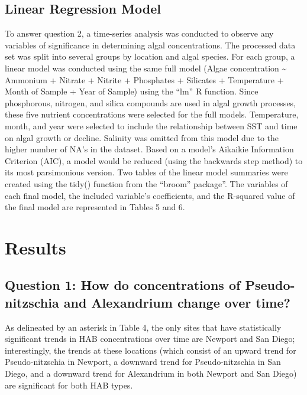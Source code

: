 \documentclass[
  12pt,
]{article}
\begin{document}
\hypertarget{linear-regression-model}{%
\subsection{Linear Regression Model}\label{linear-regression-model}}

To answer question 2, a time-series analysis was conducted to observe
any variables of significance in determining algal concentrations. The
processed data set was split into several groups by location and algal
species. For each group, a linear model was conducted using the same
full model (Algae concentration \textasciitilde{} Ammonium + Nitrate +
Nitrite + Phosphates + Silicates + Temperature + Month of Sample + Year
of Sample) using the ``lm'' R function. Since phosphorous, nitrogen, and
silica compounds are used in algal growth processes, these five nutrient
concentrations were selected for the full models. Temperature, month,
and year were selected to include the relationship between SST and time
on algal growth or decline. Salinity was omitted from this model due to
the higher number of NA's in the dataset. Based on a model's Aikaikie
Information Criterion (AIC), a model would be reduced (using the
backwards step method) to its most parsimonious version. Two tables of
the linear model summaries were created using the tidy() function from
the ``broom'' package''. The variables of each final model, the included
variable's coefficients, and the R-squared value of the final model are
represented in Tables 5 and 6.

\newpage

\hypertarget{results}{%
\section{Results}\label{results}}

\hypertarget{question-1-how-do-concentrations-of-pseudo-nitzschia-and-alexandrium-change-over-time}{%
\subsection{Question 1: How do concentrations of Pseudo-nitzschia and
Alexandrium change over
time?}\label{question-1-how-do-concentrations-of-pseudo-nitzschia-and-alexandrium-change-over-time}}

As delineated by an asterisk in Table 4, the only sites that have
statistically significant trends in HAB concentrations over time are
Newport and San Diego; interestingly, the trends at these locations
(which consist of an upward trend for Pseudo-nitzschia in Newport, a
downward trend for Pseudo-nitzschia in San Diego, and a downward trend
for Alexandrium in both Newport and San Diego) are significant for both
HAB types.
\end{document}

